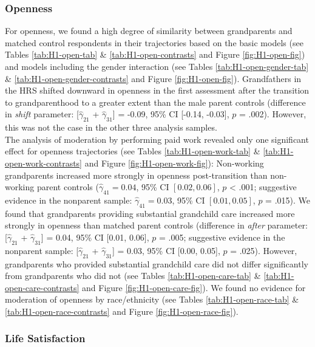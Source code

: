 \documentclass[
  english,
  man,floatsintext]{apa7}
\begin{document}
\hypertarget{openness}{%
\subsubsection{Openness}\label{openness}}

For openness, we found a high degree of similarity between grandparents and matched control respondents in their trajectories based on the basic models (see Tables \ref{tab:H1-open-tab} \& \ref{tab:H1-open-contrasts} and Figure \ref{fig:H1-open-fig}) and models including the gender interaction (see Tables \ref{tab:H1-open-gender-tab} \& \ref{tab:H1-open-gender-contrasts} and Figure \ref{fig:H1-open-fig}). Grandfathers in the HRS shifted downward in openness in the first assessment after the transition to grandparenthood to a greater extent than the male parent controls (difference in \emph{shift} parameter: {[}\(\hat{\gamma}_{21}\) + \(\hat{\gamma}_{31}\){]} = -0.09, 95\% CI {[}-0.14, -0.03{]}, \(p\) = .002). However, this was not the case in the other three analysis samples.\\
The analysis of moderation by performing paid work revealed only one significant effect for openness trajectories (see Tables \ref{tab:H1-open-work-tab} \& \ref{tab:H1-open-work-contrasts} and Figure \ref{fig:H1-open-work-fig}): Non-working grandparents increased more strongly in openness post-transition than non-working parent controls (\(\hat{\gamma}_{41} = 0.04\), 95\% CI \([0.02, 0.06]\), \(p\) \textless{} .001; suggestive evidence in the nonparent sample: \(\hat{\gamma}_{41} = 0.03\), 95\% CI \([0.01, 0.05]\), \(p\) = .015). We found that grandparents providing substantial grandchild care increased more strongly in openness than matched parent controls (difference in \emph{after} parameter: {[}\(\hat{\gamma}_{21}\) + \(\hat{\gamma}_{31}\){]} = 0.04, 95\% CI {[}0.01, 0.06{]}, \(p\) = .005; suggestive evidence in the nonparent sample: {[}\(\hat{\gamma}_{21}\) + \(\hat{\gamma}_{31}\){]} = 0.03, 95\% CI {[}0.00, 0.05{]}, \(p\) = .025). However, grandparents who provided substantial grandchild care did not differ significantly from grandparents who did not (see Tables \ref{tab:H1-open-care-tab} \& \ref{tab:H1-open-care-contrasts} and Figure \ref{fig:H1-open-care-fig}). We found no evidence for moderation of openness by race/ethnicity (see Tables \ref{tab:H1-open-race-tab} \& \ref{tab:H1-open-race-contrasts} and Figure \ref{fig:H1-open-race-fig}).

\hypertarget{life-satisfaction-1}{%
\subsubsection{Life Satisfaction}\label{life-satisfaction-1}}
\end{document}
